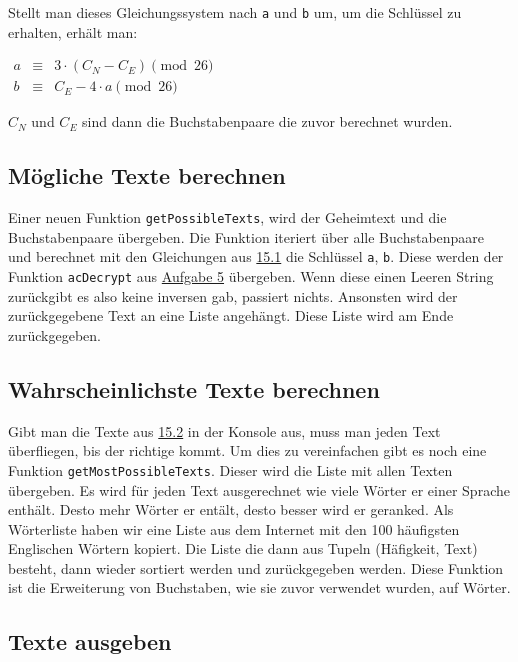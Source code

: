 \documentclass[12pt]{article}
\begin{document}
Stellt man dieses Gleichungssystem nach \texttt{a} und \texttt{b} um, um die Schlüssel zu erhalten, erhält man:

$
\begin{array}{lcl} 
a & \equiv & 3 \cdot (C_N - C_E) \pmod{26}\\
b & \equiv & C_E - 4 \cdot a \pmod{26} \end{array}
$

$C_N$ und $C_E$ sind dann die Buchstabenpaare die zuvor berechnet wurden. 

\subsection{Mögliche Texte berechnen}
\label{subsec:aufgabe_15_2}
Einer neuen Funktion \texttt{getPossibleTexts}, wird der Geheimtext und die Buchstabenpaare übergeben. Die Funktion iteriert über alle Buchstabenpaare und berechnet mit den Gleichungen aus \hyperref[subsec:aufgabe_15_1]{15.1} die Schlüssel \texttt{a}, \texttt{b}. Diese werden der Funktion \texttt{acDecrypt} aus \hyperref[sec:aufgabe_5]{Aufgabe 5} übergeben. Wenn diese einen Leeren String zurückgibt es also keine inversen gab, passiert nichts. Ansonsten wird der zurückgegebene Text an eine Liste angehängt. Diese Liste wird am Ende zurückgegeben.

\subsection{Wahrscheinlichste Texte berechnen}

Gibt man die Texte aus \hyperref[subsec:aufgabe_15_2]{15.2} in der Konsole aus, muss man jeden Text überfliegen, bis der richtige kommt. Um dies zu vereinfachen gibt es noch eine Funktion \texttt{getMostPossibleTexts}. Dieser wird die Liste mit allen Texten übergeben. Es wird für jeden Text ausgerechnet wie viele Wörter er einer Sprache enthält. Desto mehr Wörter er entält, desto besser wird er geranked. Als Wörterliste haben wir eine Liste aus dem Internet mit den 100 häufigsten Englischen Wörtern kopiert. Die Liste die dann aus Tupeln (Häfigkeit, Text) besteht, dann wieder sortiert werden und zurückgegeben werden. Diese Funktion ist die Erweiterung von Buchstaben, wie sie zuvor verwendet wurden, auf Wörter.

\subsection{Texte ausgeben}
\end{document}
